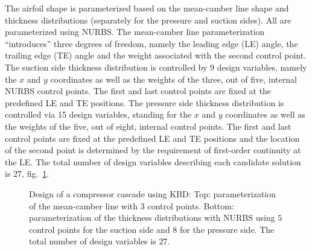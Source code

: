 The airfoil shape is parameterized based on the mean-camber line shape and thickness distributions (separately for the pressure and  suction sides). All are parameterized using NURBS. The mean-camber line parameterization ``introduces'' three degrees of freedom, namely the leading edge (LE) angle, the trailing edge (TE) angle and the weight associated with the second control point. The suction side thickness distribution is controlled by $9$ design variables, namely the $x$ and $y$ coordinates as well as the weights of the three, out of five, internal NURBS control points. The first and last control points are fixed at the predefined LE and TE positions. The pressure side thickness distribution is controlled via 15 design variables, standing for the $x$ and $y$ coordinates as well as the weights of the five, out of eight, internal control points. The first and last control points are fixed at the predefined LE and TE positions and the location of the second point is determined by the requirement of first-order continuity at the LE.  The total number of design variables describing each candidate solution is $27$, fig.\ \ref{CBRparam}. 

\begin{figure}[h!]
\begin{minipage}[b]{1\linewidth}
 \centering
\end{minipage}
\caption{Design of a compressor cascade using KBD: Top: parameterization of the mean-camber line with $3$ control points. Bottom:  parameterization of the thickness distributions with NURBS using $5$ control points for the suction side and $8$ for the pressure side. The total number of design variables is $27$.} 
\label{CBRparam}
\end{figure}

